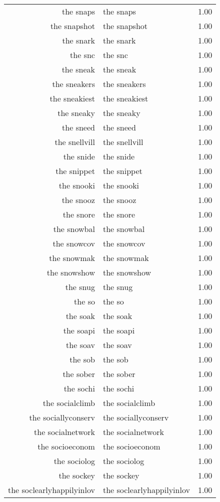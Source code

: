 \begin{table}[ht]
\begin{tabular}{rlr}
  the snaps & the snaps & 1.00 \\ 
  the snapshot & the snapshot & 1.00 \\ 
  the snark & the snark & 1.00 \\ 
  the snc & the snc & 1.00 \\ 
  the sneak & the sneak & 1.00 \\ 
  the sneakers & the sneakers & 1.00 \\ 
  the sneakiest & the sneakiest & 1.00 \\ 
  the sneaky & the sneaky & 1.00 \\ 
  the sneed & the sneed & 1.00 \\ 
  the snellvill & the snellvill & 1.00 \\ 
  the snide & the snide & 1.00 \\ 
  the snippet & the snippet & 1.00 \\ 
  the snooki & the snooki & 1.00 \\ 
  the snooz & the snooz & 1.00 \\ 
  the snore & the snore & 1.00 \\ 
  the snowbal & the snowbal & 1.00 \\ 
  the snowcov & the snowcov & 1.00 \\ 
  the snowmak & the snowmak & 1.00 \\ 
  the snowshow & the snowshow & 1.00 \\ 
  the snug & the snug & 1.00 \\ 
  the so & the so & 1.00 \\ 
  the soak & the soak & 1.00 \\ 
  the soapi & the soapi & 1.00 \\ 
  the soav & the soav & 1.00 \\ 
  the sob & the sob & 1.00 \\ 
  the sober & the sober & 1.00 \\ 
  the sochi & the sochi & 1.00 \\ 
  the socialclimb & the socialclimb & 1.00 \\ 
  the sociallyconserv & the sociallyconserv & 1.00 \\ 
  the socialnetwork & the socialnetwork & 1.00 \\ 
  the socioeconom & the socioeconom & 1.00 \\ 
  the sociolog & the sociolog & 1.00 \\ 
  the sockey & the sockey & 1.00 \\ 
  the soclearlyhappilyinlov & the soclearlyhappilyinlov & 1.00 \\ 

\end{tabular}
\end{table}
